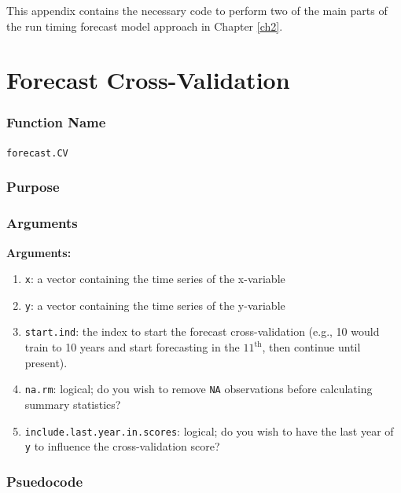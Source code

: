 \documentclass[12pt,]{book}
\providecommand{\tightlist}{%
  \setlength{\itemsep}{0pt}\setlength{\parskip}{0pt}}
\theoremstyle{definition}
\theoremstyle{definition}
\theoremstyle{definition}
\theoremstyle{remark}
\begin{document}
\noindent
This appendix contains the necessary code to perform two of the main
parts of the run timing forecast model approach in Chapter \ref{ch2}.

\section*{Forecast Cross-Validation}\label{forecast-cross-validation}

\subsubsection*{Function Name}\label{function-name}

\texttt{forecast.CV}

\subsubsection*{Purpose}\label{purpose}

\subsubsection*{Arguments}\label{arguments}

\noindent
\textbf{Arguments:}

\begin{enumerate}
\def\labelenumi{\arabic{enumi}.}
\tightlist
\item
  \texttt{x}: a vector containing the time series of the x-variable
\item
  \texttt{y}: a vector containing the time series of the y-variable
\item
  \texttt{start.ind}: the index to start the forecast cross-validation
  (e.g., 10 would train to 10 years and start forecasting in the
  \(11^{\text{th}}\), then continue until present).
\item
  \texttt{na.rm}: logical; do you wish to remove \texttt{NA}
  observations before calculating summary statistics?
\item
  \texttt{include.last.year.in.scores}: logical; do you wish to have the
  last year of \texttt{y} to influence the cross-validation score?
\end{enumerate}

\subsubsection*{Psuedocode}\label{psuedocode}
\end{document}
